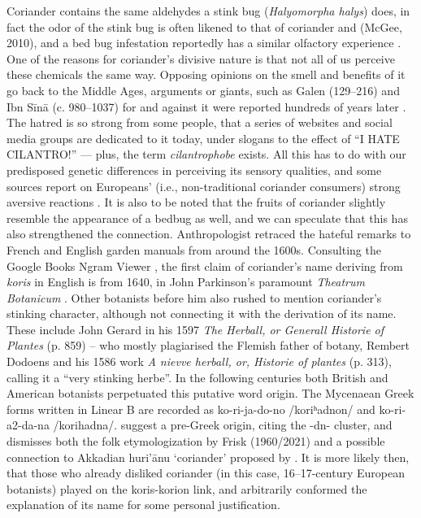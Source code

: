 Coriander contains the same aldehydes a stink bug (\textit{Halyomorpha halys}) does, in fact the odor of the stink bug is often likened to that of coriander and (McGee, 2010), and a bed bug infestation reportedly has a similar olfactory experience \autocite{davidson_oxford_2014}. One of the reasons for coriander’s divisive nature is that not all of us perceive these chemicals the same way. Opposing opinions on the smell and benefits of it go back to the Middle Ages, arguments or giants, such as Galen (129--216) and Ibn Sīnā (c. 980--1037) for and against it were reported hundreds of years later \autocite[cf.][]{parkinson_theatrum_1640}. The hatred is so strong from some people, that a series of websites and social media groups are dedicated to it today, under slogans to the effect of “I HATE CILANTRO!” — plus, the term \emph{cilantrophobe} exists. All this has to do with our predisposed genetic differences in perceiving its sensory qualities, and some sources report on Europeans’ (i.e., non-traditional coriander consumers) strong aversive reactions \autocite{eriksson_genetic_2012}. It is also to be noted that the fruits of coriander slightly resemble the appearance of a bedbug as well, and we can speculate that this has also strengthened the connection. Anthropologist \textcite{leach_rehabilitating_2001} retraced the hateful remarks to French and English garden manuals from around the 1600s.
Consulting the Google Books Ngram Viewer \autocite{michel_quantitative_2011}, the first claim of coriander’s name deriving from \textit{koris} in English is from 1640, in John Parkinson’s paramount \textit{Theatrum Botanicum} \autocite[918-919]{parkinson_theatrum_1640}. Other botanists before him also rushed to mention coriander’s stinking character, although not connecting it with the derivation of its name. These include John Gerard in his 1597 \textit{The Herball, or Generall Historie of Plantes} (p. 859) – who mostly plagiarised the Flemish father of botany, Rembert Dodoens and his 1586 work \textit{A nievve herball, or, Historie of plantes} (p. 313), calling it a “very stinking herbe”. In the following centuries both British and American botanists perpetuated this putative word origin. The Mycenaean Greek forms written in Linear B are recorded as ko-ri-ja-do-no /koriʰadnon/ and ko-ri-a2-da-na /korihadna/. \textcite[754]{beekes_etymological_2010} suggest a pre-Greek origin, citing the -dn- cluster, and dismisses both the folk etymologization by \textcite{frisk_griechisches_2021} Frisk (1960/2021) and a possible connection to Akkadian huri’ānu `coriander' proposed by \textcite{szemerenyi_review_1971}. It is more likely then, that those who already disliked coriander (in this case, 16--17-century European botanists) played on the koris-korion link, and arbitrarily conformed the explanation of its name for some personal justification.
